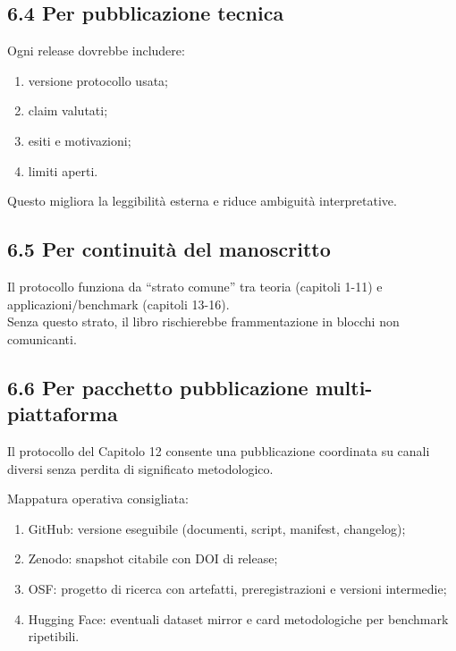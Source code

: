 \subsection{6.4 Per pubblicazione tecnica}

Ogni release dovrebbe includere:

\begin{enumerate}
\def\labelenumi{\arabic{enumi}.}
\tightlist
\item
  versione protocollo usata;
\item
  claim valutati;
\item
  esiti e motivazioni;
\item
  limiti aperti.
\end{enumerate}

Questo migliora la leggibilità esterna e riduce ambiguità interpretative.

\subsection{6.5 Per continuità del manoscritto}

Il protocollo funziona da ``strato comune'' tra teoria (capitoli 1-11) e applicazioni/benchmark (capitoli 13-16).\\
Senza questo strato, il libro rischierebbe frammentazione in blocchi non comunicanti.

\subsection{6.6 Per pacchetto pubblicazione multi-piattaforma}

Il protocollo del Capitolo 12 consente una pubblicazione coordinata su canali diversi senza perdita di significato metodologico.

Mappatura operativa consigliata:

\begin{enumerate}
\def\labelenumi{\arabic{enumi}.}
\tightlist
\item
  GitHub: versione eseguibile (documenti, script, manifest, changelog);
\item
  Zenodo: snapshot citabile con DOI di release;
\item
  OSF: progetto di ricerca con artefatti, preregistrazioni e versioni intermedie;
\item
  Hugging Face: eventuali dataset mirror e card metodologiche per benchmark ripetibili.
\end{enumerate}

